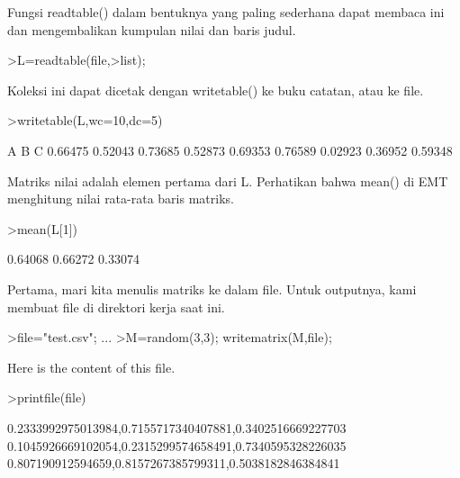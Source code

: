 \documentclass{article}
\begin{document}
\begin{eulernotebook}
\begin{eulercomment}
\begin{eulercomment}
\begin{eulercomment}
\begin{eulercomment}
\begin{eulercomment}
\begin{eulercomment}
\begin{eulercomment}
\begin{eulercomment}
\begin{eulercomment}
\begin{eulercomment}
\begin{eulercomment}
\begin{eulercomment}
\begin{eulercomment}
\begin{eulercomment}
\begin{euleroutput}
\end{euleroutput}
\begin{eulercomment}
Fungsi readtable() dalam bentuknya yang paling sederhana dapat membaca
ini dan mengembalikan kumpulan nilai dan baris judul.
\end{eulercomment}
\begin{eulerprompt}
>L=readtable(file,>list);
\end{eulerprompt}
\begin{eulercomment}
Koleksi ini dapat dicetak dengan writetable() ke buku catatan, atau ke
file.
\end{eulercomment}
\begin{eulerprompt}
>writetable(L,wc=10,dc=5)
\end{eulerprompt}
\begin{euleroutput}
           A         B         C
     0.66475   0.52043   0.73685
     0.52873   0.69353   0.76589
     0.02923   0.36952   0.59348
\end{euleroutput}
\begin{eulercomment}
Matriks nilai adalah elemen pertama dari L. Perhatikan bahwa mean() di
EMT menghitung nilai rata-rata baris matriks.
\end{eulercomment}
\begin{eulerprompt}
>mean(L[1])
\end{eulerprompt}
\begin{euleroutput}
    0.64068 
    0.66272 
    0.33074 
\end{euleroutput}
\begin{eulercomment}
Pertama, mari kita menulis matriks ke dalam file. Untuk outputnya,
kami membuat file di direktori kerja saat ini.
\end{eulercomment}
\begin{eulerprompt}
>file="test.csv";  ...
>M=random(3,3); writematrix(M,file);
\end{eulerprompt}
\begin{eulercomment}
Here is the content of this file.
\end{eulercomment}
\begin{eulerprompt}
>printfile(file)
\end{eulerprompt}
\begin{euleroutput}
  0.2333992975013984,0.7155717340407881,0.3402516669227703
  0.1045926669102054,0.2315299574658491,0.7340595328226035
  0.807190912594659,0.8157267385799311,0.5038182846384841
  

\end{euleroutput}
\end{eulercomment}
\end{eulercomment}
\end{eulercomment}
\end{eulercomment}
\end{eulercomment}
\end{eulercomment}
\end{eulercomment}
\end{eulercomment}
\end{eulercomment}
\end{eulercomment}
\end{eulercomment}
\end{eulercomment}
\end{eulercomment}
\end{eulercomment}
\end{eulernotebook}
\end{document}
